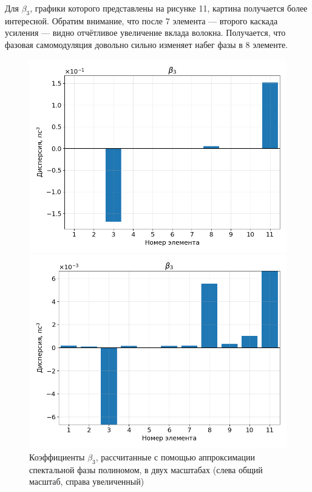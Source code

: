 \documentclass[12pt]{article}
\begin{document}
Для $\beta_3$, графики которого представлены на рисунке 11, картина получается более интересной.
Обратим внимание, что после 7 элемента — второго каскада усиления — видно отчётливое увеличение вклада волокна.
Получается, что фазовая самомодуляция довольно сильно изменяет набег фазы в 8 элементе.

\begin{figure}[h!]
    \centering
    \begin{minipage}[b]{0.5\textwidth}
        \includegraphics[width=\linewidth]{Images/Gauss Pulse/Беты/beta_3_full}
    \end{minipage}%
    \begin{minipage}[b]{0.5\textwidth}
        \includegraphics[width=\linewidth]{Images/Gauss Pulse/Беты/beta_3_cut}
    \end{minipage}

    \caption{Коэффициенты $\beta_3$, рассчитанные с помощью аппроксимации спектальной фазы полиномом,
     в двух масштабах (слева общий масштаб, справа увеличенный)}
    \label{fig:both}
\end{figure}
\end{document}
